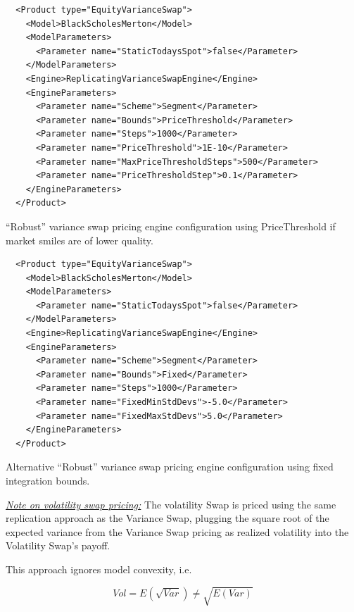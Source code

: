 \begin{listing}[ht]
\begin{verbatim}
  <Product type="EquityVarianceSwap">
    <Model>BlackScholesMerton</Model>
    <ModelParameters>
      <Parameter name="StaticTodaysSpot">false</Parameter>
    </ModelParameters>
    <Engine>ReplicatingVarianceSwapEngine</Engine>
    <EngineParameters>
      <Parameter name="Scheme">Segment</Parameter>
      <Parameter name="Bounds">PriceThreshold</Parameter>
      <Parameter name="Steps">1000</Parameter>
      <Parameter name="PriceThreshold">1E-10</Parameter>
      <Parameter name="MaxPriceThresholdSteps">500</Parameter>
      <Parameter name="PriceThresholdStep">0.1</Parameter>
    </EngineParameters>
  </Product>
\end{verbatim}
\caption{``Robust'' variance swap pricing engine configuration using PriceThreshold if market smiles are of lower quality.}
\label{eq_var_swap_pricing_config_1}
\end{listing}

\begin{listing}[ht]
\begin{verbatim}
  <Product type="EquityVarianceSwap">
    <Model>BlackScholesMerton</Model>
    <ModelParameters>
      <Parameter name="StaticTodaysSpot">false</Parameter>
    </ModelParameters>
    <Engine>ReplicatingVarianceSwapEngine</Engine>
    <EngineParameters>
      <Parameter name="Scheme">Segment</Parameter>
      <Parameter name="Bounds">Fixed</Parameter>
      <Parameter name="Steps">1000</Parameter>
      <Parameter name="FixedMinStdDevs">-5.0</Parameter>
      <Parameter name="FixedMaxStdDevs">5.0</Parameter>
    </EngineParameters>
  </Product>
\end{verbatim}
\caption{Alternative ``Robust'' variance swap pricing engine configuration using fixed integration bounds.}
\label{eq_var_swap_pricing_config_2}
\end{listing}

\bigskip

\underline{\emph{Note on volatility swap pricing:}} The volatility Swap is priced using the same replication approach as
the Variance Swap, plugging the square root of the expected variance from the Variance Swap pricing as realized
volatility into the Volatility Swap's payoff.

This approach ignores model convexity, i.e.

$$
Vol = E(\sqrt{Var}) \neq \sqrt{ E(Var) }
$$

